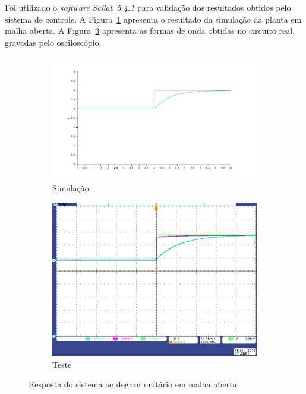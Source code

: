 \documentclass[12pt,openright,oneside,a4paper,brazil]{abntex2}
\begin{document}
Foi utilizado o \textit{software} \textit{Scilab 5.4.1} para validação dos resultados obtidos pelo sistema de controle. A Figura~\ref{sim_ma} apresenta o resultado da simulação da planta em malha aberta. A Figura~\ref{res_ma} apresenta as formas de onda obtidas no circuito real, gravadas pelo osciloscópio. 

\begin{figure}[ht]
        \center
        \begin{subfigure}[b]{0.55\textwidth}
        	\includegraphics[width=\textwidth]{pid/openloop.pdf}
        	\caption{Simulação}
			\label{sim_ma}
        \end{subfigure}
        \begin{subfigure}[b]{0.4\textwidth}
        	\includegraphics[width=\textwidth]{pid/openloop.png}
        	\caption{Teste}
        	\label{res_ma}
        \end{subfigure}
        \caption{Resposta do sistema ao degrau unitário em malha aberta}
\end{figure}
\end{document}
